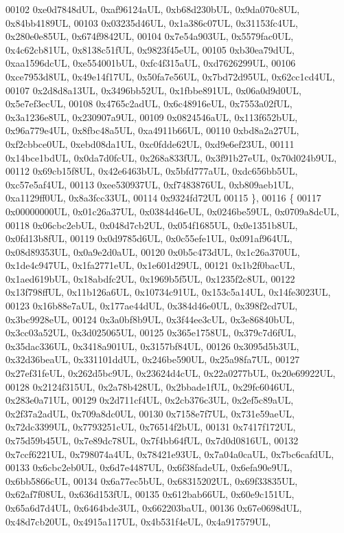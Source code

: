 \begin{DoxyCode}
00102     0xe0d7848dUL, 0xaf96124aUL, 0xb68d230bUL, 0x9da070c8UL, 0x84bb4189UL,
00103     0x03235d46UL, 0x1a386c07UL, 0x31153fc4UL, 0x280e0e85UL, 0x674f9842UL,
00104     0x7e54a903UL, 0x5579fac0UL, 0x4c62cb81UL, 0x8138c51fUL, 0x9823f45eUL,
00105     0xb30ea79dUL, 0xaa1596dcUL, 0xe554001bUL, 0xfc4f315aUL, 0xd7626299UL,
00106     0xce7953d8UL, 0x49e14f17UL, 0x50fa7e56UL, 0x7bd72d95UL, 0x62cc1cd4UL,
00107     0x2d8d8a13UL, 0x3496bb52UL, 0x1fbbe891UL, 0x06a0d9d0UL, 0x5e7ef3ecUL,
00108     0x4765c2adUL, 0x6c48916eUL, 0x7553a02fUL, 0x3a1236e8UL, 0x230907a9UL,
00109     0x0824546aUL, 0x113f652bUL, 0x96a779e4UL, 0x8fbc48a5UL, 0xa4911b66UL,
00110     0xbd8a2a27UL, 0xf2cbbce0UL, 0xebd08da1UL, 0xc0fdde62UL, 0xd9e6ef23UL,
00111     0x14bce1bdUL, 0x0da7d0fcUL, 0x268a833fUL, 0x3f91b27eUL, 0x70d024b9UL,
00112     0x69cb15f8UL, 0x42e6463bUL, 0x5bfd777aUL, 0xdc656bb5UL, 0xc57e5af4UL,
00113     0xee530937UL, 0xf7483876UL, 0xb809aeb1UL, 0xa1129ff0UL, 0x8a3fcc33UL,
00114     0x9324fd72UL
00115   \},
00116   \{
00117     0x00000000UL, 0x01c26a37UL, 0x0384d46eUL, 0x0246be59UL, 0x0709a8dcUL,
00118     0x06cbc2ebUL, 0x048d7cb2UL, 0x054f1685UL, 0x0e1351b8UL, 0x0fd13b8fUL,
00119     0x0d9785d6UL, 0x0c55efe1UL, 0x091af964UL, 0x08d89353UL, 0x0a9e2d0aUL,
00120     0x0b5c473dUL, 0x1c26a370UL, 0x1de4c947UL, 0x1fa2771eUL, 0x1e601d29UL,
00121     0x1b2f0bacUL, 0x1aed619bUL, 0x18abdfc2UL, 0x1969b5f5UL, 0x1235f2c8UL,
00122     0x13f798ffUL, 0x11b126a6UL, 0x10734c91UL, 0x153c5a14UL, 0x14fe3023UL,
00123     0x16b88e7aUL, 0x177ae44dUL, 0x384d46e0UL, 0x398f2cd7UL, 0x3bc9928eUL,
00124     0x3a0bf8b9UL, 0x3f44ee3cUL, 0x3e86840bUL, 0x3cc03a52UL, 0x3d025065UL,
00125     0x365e1758UL, 0x379c7d6fUL, 0x35dac336UL, 0x3418a901UL, 0x3157bf84UL,
00126     0x3095d5b3UL, 0x32d36beaUL, 0x331101ddUL, 0x246be590UL, 0x25a98fa7UL,
00127     0x27ef31feUL, 0x262d5bc9UL, 0x23624d4cUL, 0x22a0277bUL, 0x20e69922UL,
00128     0x2124f315UL, 0x2a78b428UL, 0x2bbade1fUL, 0x29fc6046UL, 0x283e0a71UL,
00129     0x2d711cf4UL, 0x2cb376c3UL, 0x2ef5c89aUL, 0x2f37a2adUL, 0x709a8dc0UL,
00130     0x7158e7f7UL, 0x731e59aeUL, 0x72dc3399UL, 0x7793251cUL, 0x76514f2bUL,
00131     0x7417f172UL, 0x75d59b45UL, 0x7e89dc78UL, 0x7f4bb64fUL, 0x7d0d0816UL,
00132     0x7ccf6221UL, 0x798074a4UL, 0x78421e93UL, 0x7a04a0caUL, 0x7bc6cafdUL,
00133     0x6cbc2eb0UL, 0x6d7e4487UL, 0x6f38fadeUL, 0x6efa90e9UL, 0x6bb5866cUL,
00134     0x6a77ec5bUL, 0x68315202UL, 0x69f33835UL, 0x62af7f08UL, 0x636d153fUL,
00135     0x612bab66UL, 0x60e9c151UL, 0x65a6d7d4UL, 0x6464bde3UL, 0x662203baUL,
00136     0x67e0698dUL, 0x48d7cb20UL, 0x4915a117UL, 0x4b531f4eUL, 0x4a917579UL,

\end{DoxyCode}
